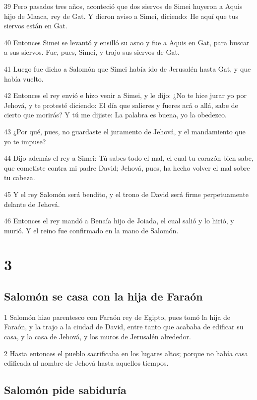 \par 39 Pero pasados tres años, aconteció que dos siervos de Simei huyeron a Aquis hijo de Maaca, rey de Gat. Y dieron aviso a Simei, diciendo: He aquí que tus siervos están en Gat.
\par 40 Entonces Simei se levantó y ensilló su asno y fue a Aquis en Gat, para buscar a sus siervos. Fue, pues, Simei, y trajo sus siervos de Gat.
\par 41 Luego fue dicho a Salomón que Simei había ido de Jerusalén hasta Gat, y que había vuelto.
\par 42 Entonces el rey envió e hizo venir a Simei, y le dijo: ¿No te hice jurar yo por Jehová, y te protesté diciendo: El día que salieres y fueres acá o allá, sabe de cierto que morirás? Y tú me dijiste: La palabra es buena, yo la obedezco.
\par 43 ¿Por qué, pues, no guardaste el juramento de Jehová, y el mandamiento que yo te impuse?
\par 44 Dijo además el rey a Simei: Tú sabes todo el mal, el cual tu corazón bien sabe, que cometiste contra mi padre David; Jehová, pues, ha hecho volver el mal sobre tu cabeza.
\par 45 Y el rey Salomón será bendito, y el trono de David será firme perpetuamente delante de Jehová.
\par 46 Entonces el rey mandó a Benaía hijo de Joiada, el cual salió y lo hirió, y murió. Y el reino fue confirmado en la mano de Salomón.

\chapter{3}

\section*{Salomón se casa con la hija de Faraón}

\par 1 Salomón hizo parentesco con Faraón rey de Egipto, pues tomó la hija de Faraón, y la trajo a la ciudad de David, entre tanto que acababa de edificar su casa, y la casa de Jehová, y los muros de Jerusalén alrededor.
\par 2 Hasta entonces el pueblo sacrificaba en los lugares altos; porque no había casa edificada al nombre de Jehová hasta aquellos tiempos.

\section*{Salomón pide sabiduría}

